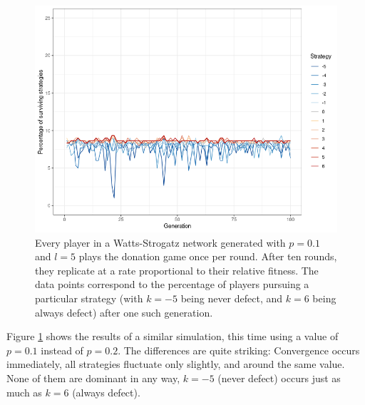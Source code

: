 \documentclass{JASSS}
\begin{document}
\begin{figure}
	\centering
	\includegraphics[width=\linewidth]{./figures/results_WS_N300_truthful_new_default.png}
	\caption{Every player in a Watts-Strogatz network generated with $p=0.1$ and $l=5$ plays the donation game once per round. After ten rounds, they replicate at a rate proportional to their relative fitness. The data points correspond to the percentage of players pursuing a particular strategy (with $k=-5$ being never defect, and $k=6$ being always defect) after one such generation.}
	\label{WS_300_default}
\end{figure}

Figure \ref{WS_300_default} shows the results of a similar simulation, this time using a value of $p=0.1$ instead of $p=0.2$. The differences are quite striking: Convergence occurs immediately, all strategies fluctuate only slightly, and around the same value. None of them are dominant in any way, $k=-5$ (never defect) occurs just as much as $k=6$ (always defect).
\end{document}
